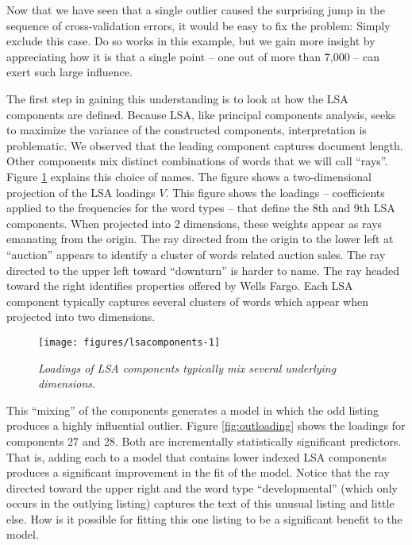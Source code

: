 \documentclass[12pt]{article}\usepackage[]{graphicx}\usepackage[]{color}
\newenvironment{knitrout}{}{} %
\begin{document}
 Now that we have seen that a single outlier caused the surprising
 jump in the sequence of cross-validation errors, it would be easy to
 fix the problem: Simply exclude this case.  Do so works in this
 example, but we gain more insight by appreciating how it is that a
 single point -- one out of more than 7,000 -- can exert such large
 influence.


 The first step in gaining this understanding is to look at how the
 LSA components are defined.  Because LSA, like principal components
 analysis, seeks to maximize the variance of the constructed
 components, interpretation is problematic.  We observed that the
 leading component captures document length.  Other components mix
 distinct combinations of words that we will call ``rays''.  Figure
 \ref{fig:lsacomponents} explains this choice of names.  The figure
 shows a two-dimensional projection of the LSA loadings $V$.  This
 figure shows the loadings -- coefficients applied to the frequencies
 for the word types -- that define the 8th and 9th LSA components.
  When projected into 2 dimensions, these weights appear as rays
 emanating from the origin.  The ray directed from the origin to the
 lower left at ``auction'' appears to identify a cluster of words
 related auction sales.  The ray directed to the upper left toward
 ``downturn'' is harder to name.  The ray headed toward the right
 identifies properties offered by Wells Fargo.  Each LSA component
 typically captures several clusters of words which appear when
projected into two dimensions.



\begin{figure}
\begin{knitrout}
\color{fgcolor}

{\centering \texttt{[image: figures/lsacomponents-1]} 

}



\end{knitrout}
\caption{  \label{fig:lsacomponents}
  {\sl Loadings of LSA components typically mix several underlying dimensions.}  }
\end{figure}


 This ``mixing'' of the components generates a model in which the odd
 listing produces a highly influential outlier.  Figure
 \ref{fig:outloading} shows the loadings for components 27 and 28.
  Both are incrementally statistically significant predictors.  That
 is, adding each to a model that contains lower indexed LSA components
 produces a significant improvement in the fit of the model.  Notice
 that the ray directed toward the upper right and the word type
 ``developmental'' (which only occurs in the outlying listing)
 captures the text of this unusual listing and little else.  How is it
 possible for fitting this one listing to be a significant benefit to
 the model.
\end{document}
